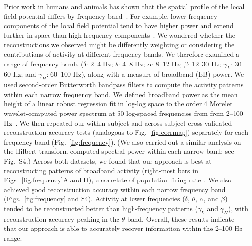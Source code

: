 \documentclass[11pt]{article}
\newcommand{\freqpower}{S4}
\begin{document}
Prior work in humans and animals has shown that the spatial profile of the local
field potential differs by frequency band~\citep[e.g., with respect to volume
conductance properties and contribution to the local field
potential;][]{BuzsEtal12, FrieEtal07, CronEtal11}.  For example, lower frequency
components of the local field potential tend to have higher power and extend
further in space than high-frequency components~\citep[e.g., ][]{MillEtal07a,
MannEtal09}.  We wondered whether the reconstructions we observed might be
differently weighting or considering the contributions of activity at different
frequency bands.  We therefore examined a range of frequency bands ($\delta$:
2--4 Hz; $\theta$: 4--8 Hz; $\alpha$: 8--12 Hz; $\beta$: 12--30 Hz; $\gamma_L$:
30--60 Hz; and $\gamma_H$: 60--100 Hz), along with a measure of broadband (BB)
power. We used second-order Butterworth bandpass filters to compute the activity
patterns within each narrow frequency band.  We defined broadband power as the
mean height of a linear robust regression fit in log-log space to the order 4
Morelet wavelet-computed power spectrum at 50 log-spaced frequencies from from
2--100 Hz~\citep{MannEtal09}. We then repeated our within-subject and
across-subject cross-validated reconstruction accuracy tests (analogous to
Fig.~\ref{fig:corrmap}) separately for each frequency band
(Fig.~\ref{fig:frequency}). (We also carried out a similar analysis on the
Hilbert transform-computed spectral power within each narrow band; see
Fig.~\freqpower.) Across both datasets, we found that our approach is best at
reconstructing patterns of broadband activity (right-most bars in
Figs.~\ref{fig:frequency}A and D), a correlate of population firing
rate~\citep{MannEtal09}.  We also achieved good reconstruction accuracy within
each narrow frequency band (Figs.~\ref{fig:frequency} and \freqpower).  Activity
at lower frequencies ($\delta$, $\theta$, $\alpha$, and $\beta$) tended to be
reconstructed better than high-frequency patterns ($\gamma_L$ and $\gamma_H$),
with reconstruction accuracy peaking in the $\theta$ band.  Overall, these
results indicate that our approach is able to accurately recover information
within the 2--100 Hz range.
\end{document}
